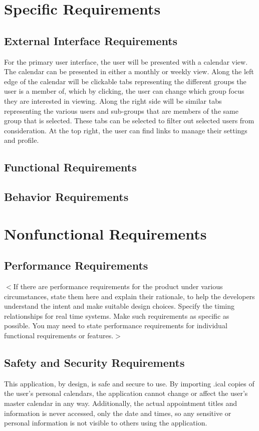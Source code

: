 \documentclass{scrreprt}
\begin{document}
\chapter{Specific Requirements}

\section{External Interface Requirements}
For the primary user interface, the user will be presented with a calendar view.
The calendar can be presented in either a monthly or weekly view. Along the left
edge of the calendar will be clickable tabs representing the different groups
the user is a member of, which by clicking, the user can change which group
focus they are interested in viewing. Along the right side will be similar tabs
representing the various users and sub-groups that are members of the same
group that is selected. These tabs can be selected to filter out selected users
from consideration. At the top right, the user can find links to manage their
settings and profile.
\section{Functional Requirements}

\section{Behavior Requirements}


\chapter{Nonfunctional Requirements}

\section{Performance Requirements}
$<$If there are performance requirements for the product under various
circumstances, state them here and explain their rationale, to help the
developers understand the intent and make suitable design choices. Specify the
timing relationships for real time systems. Make such requirements as specific
as possible. You may need to state performance requirements for individual
functional requirements or features.$>$

\section{Safety and Security Requirements}
This application, by design, is safe and secure to use. By importing .ical
copies of the user's personal calendars, the application cannot change or affect
the user's master calendar in any way. Additionally, the actual appointment
titles and information is never accessed, only the date and times, so any
sensitive or personal information is not visible to others using the application.
\end{document}
